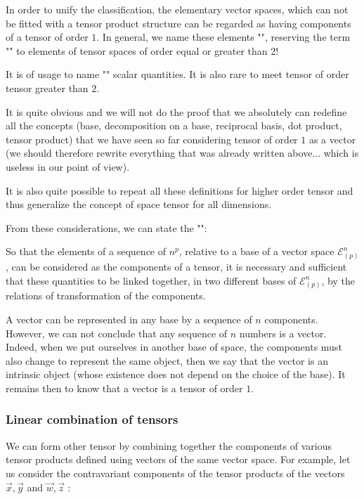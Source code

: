 	In order to unify the classification, the elementary vector spaces, which can not be fitted with a tensor product structure can be regarded as having components of a tensor of order $1$. In general, we name these elements "", reserving the term "" to elements of tensor spaces of order equal or greater than $2$!
	\begin{tcolorbox}[title=Remark,colframe=black,arc=10pt]
	It is of usage to name "" scalar quantities. It is also rare to meet tensor of order tensor greater than $2$.
	\end{tcolorbox}
	It is quite obvious and we will not do the proof  that we absolutely can redefine all the concepts (base, decomposition on a base, reciprocal basis, dot product, tensor product) that we have seen so far considering tensor of order $1$ as a vector (we should therefore rewrite everything that was already written above... which is useless in our point of view).

	It is also quite possible to repeat all these definitions for higher order tensor and thus generalize the concept of space tensor for all dimensions.

	From these considerations, we can state the "":
	
	So that the elements of a sequence of $n^p$, relative to a base of a vector space $\mathcal{E}_{(p)}^n$, can be considered as the components of a tensor, it is necessary and sufficient that these quantities to be linked together, in two different bases of $\mathcal{E}_{(p)}^n$, by the relations of transformation of the components.
	\begin{tcolorbox}[title=Remark,colframe=black,arc=10pt]
	A vector can be represented in any base by a sequence of $n$ components. However, we can not conclude that any sequence of $n$ numbers is a vector. Indeed, when we put ourselves in another base of space, the components must also change to represent the same object, then we say that the vector is an intrinsic object (whose existence does not depend on the choice of the base). It remains then to know that a vector is a tensor of order $1$.	
	\end{tcolorbox}

	\subsubsection{Linear combination of tensors}
	We can form other tensor by combining together the components of various tensor products defined using vectors of the same vector space. For example, let us consider the contravariant components of the tensor products of the vectors $\vec{x},\vec{y}$ and $\vec{w},\vec{z}$ :
	
